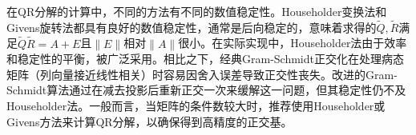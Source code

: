 
\begin{note}
	在QR分解的计算中，不同的方法有不同的数值稳定性。Householder变换法和Givens旋转法都具有良好的数值稳定性，通常是后向稳定的，意味着求得的$\tilde{Q},\tilde{R}$满足$\tilde{Q}\tilde{R} = A + E$且$\|E\|$相对$\|A\|$很小。在实际实现中，Householder法由于效率和稳定性的平衡，被广泛采用。相比之下，经典Gram-Schmidt正交化在处理病态矩阵（列向量接近线性相关）时容易因舍入误差导致正交性丧失。改进的Gram-Schmidt算法通过在减去投影后重新正交一次来缓解这一问题，但其稳定性仍不及Householder法。一般而言，当矩阵的条件数较大时，推荐使用Householder或Givens方法来计算QR分解，以确保得到高精度的正交基。
\end{note}

